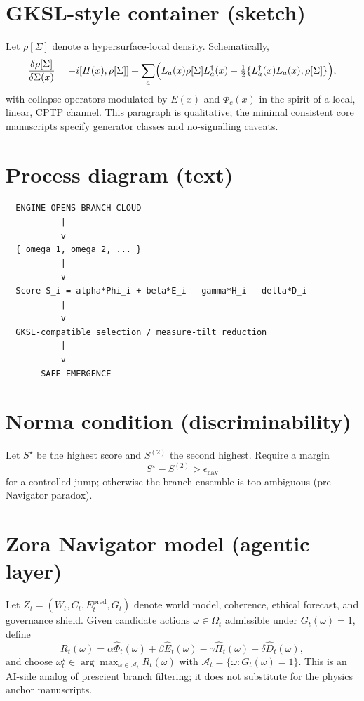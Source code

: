 \documentclass[11pt]{article}
\begin{document}
\section{GKSL-style container (sketch)}
Let $\rho[\Sigma]$ denote a hypersurface-local density. Schematically,
\begin{equation}
\frac{\delta \rho[\Sigma]}{\delta \Sigma(x)} = -i [H(x), \rho[\Sigma]] + \sum_a \Bigl( L_a(x) \rho[\Sigma] L_a^\dagger(x) - \tfrac{1}{2} \{ L_a^\dagger(x) L_a(x), \rho[\Sigma] \} \Bigr) ,
\end{equation}
with collapse operators modulated by $E(x)$ and $\Phi_c(x)$ in the spirit of a local, linear, CPTP channel. This paragraph is qualitative; the minimal consistent core manuscripts specify generator classes and no-signalling caveats.

\section{Process diagram (text)}
\begin{verbatim}
  ENGINE OPENS BRANCH CLOUD
           |
           v
  { omega_1, omega_2, ... }
           |
           v
  Score S_i = alpha*Phi_i + beta*E_i - gamma*H_i - delta*D_i
           |
           v
  GKSL-compatible selection / measure-tilt reduction
           |
           v
       SAFE EMERGENCE
\end{verbatim}

\section{Norma condition (discriminability)}
Let $S^\star$ be the highest score and $S^{(2)}$ the second highest. Require a margin
\begin{equation}
S^\star - S^{(2)} > \epsilon_{\mathrm{nav}}
\end{equation}
for a controlled jump; otherwise the branch ensemble is too ambiguous (pre-Navigator paradox).

\section{Zora Navigator model (agentic layer)}
Let $Z_t = (W_t, C_t, E^{\mathrm{pred}}_t, G_t)$ denote world model, coherence, ethical forecast, and governance shield. Given candidate actions $\omega \in \Omega_t$ admissible under $G_t(\omega)=1$, define
\begin{equation}
R_t(\omega) = \alpha \hat{\Phi}_t(\omega) + \beta \hat{E}_t(\omega) - \gamma \hat{H}_t(\omega) - \delta \hat{D}_t(\omega) ,
\end{equation}
and choose $\omega_t^\star \in \arg\max_{\omega \in \mathcal{A}_t} R_t(\omega)$ with $\mathcal{A}_t = \{ \omega : G_t(\omega)=1 \}$. This is an AI-side analog of prescient branch filtering; it does not substitute for the physics anchor manuscripts.
\end{document}
